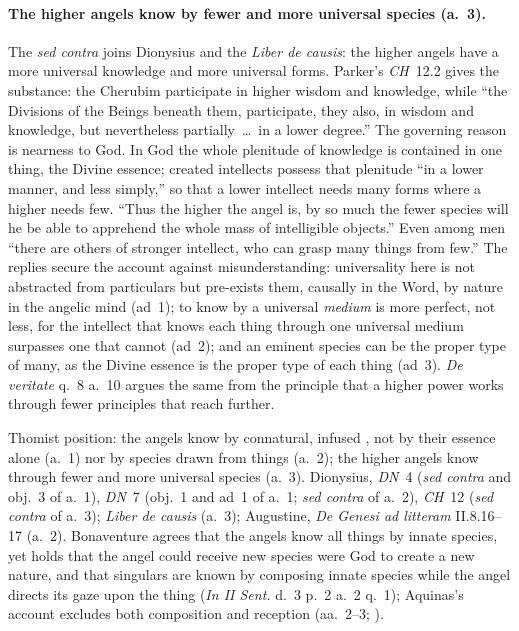 \paragraph{The higher angels know by fewer and more universal species
(a.~3).} The \emph{sed contra} joins Dionysius and the \emph{Liber de
causis}: the higher angels have a more universal knowledge and more
universal forms. Parker's \emph{CH}~12.2 gives the substance: the Cherubim
participate in higher wisdom and knowledge, while ``the Divisions of the
Beings beneath them, participate, they also, in wisdom and knowledge, but
nevertheless partially~\dots\ in a lower degree.'' The governing reason is
nearness to God. In God the whole plenitude of knowledge is contained in
one thing, the Divine essence; created intellects possess that plenitude
``in a lower manner, and less simply,'' so that a lower intellect needs
many forms where a higher needs few. ``Thus the higher the angel is, by so
much the fewer species will he be able to apprehend the whole mass of
intelligible objects.'' Even among men ``there are others of stronger
intellect, who can grasp many things from few.'' The replies secure the
account against misunderstanding: universality here is not abstracted from
particulars but pre-exists them, causally in the Word, by nature in the
angelic mind (ad~1); to know by a universal \emph{medium} is more perfect,
not less, for the intellect that knows each thing through one universal
medium surpasses one that cannot (ad~2); and an eminent species can be the
proper type of many, as the Divine essence is the proper type of each
thing (ad~3). \emph{De veritate} q.~8 a.~10 argues the same from the
principle that a higher power works through fewer principles that reach
further.

 {Thomist position: the angels know by connatural, infused
 , not by their essence alone (a.~1) nor by
 species drawn from things (a.~2); the higher angels know through fewer
 and more universal species (a.~3).}
 {Dionysius, \emph{DN}~4 (\emph{sed contra} and obj.~3 of a.~1), \emph{DN}~7 (obj.~1 and ad~1 of a.~1; \emph{sed contra} of a.~2), \emph{CH}~12
 (\emph{sed contra} of a.~3); \emph{Liber de causis} (a.~3); Augustine,
 \emph{De Genesi ad litteram} II.8.16--17 (a.~2).}
 {Bonaventure agrees that the angels know all things by innate species,
 yet holds that the angel could receive new species were God to create a
 new nature, and that singulars are known by composing innate species
 while the angel directs its gaze upon the thing (\emph{In II Sent.} d.~3
 p.~2 a.~2 q.~1); Aquinas's account excludes both composition and
 reception (aa.~2--3; ).}

